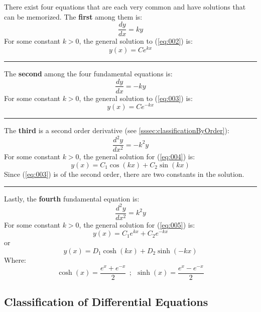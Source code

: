 \documentclass[12pt]{article}
\begin{document}
There exist four equations that are each very common and have solutions that can be memorized. The \textbf{first} among them is:
\begin{equation}
  \frac{dy}{dx} = ky
  \label{eq:002}
\end{equation}
For some constant $k>0$, the general solution to (\ref{eq:002}) is:
\begin{equation*}
  y(x) = Ce^{kx}
\end{equation*}
\hrule
The \textbf{second} among the four fundamental equations is:
\begin{equation}
  \frac{dy}{dx} = -ky
  \label{eq:003}
\end{equation}
For some constant $k>0$, the general solution to (\ref{eq:003}) is:
\begin{equation*}
  y(x) = Ce^{-kx}
\end{equation*}
\hrule
The \textbf{third} is a second order derivative (see \ref{sssec:classificationByOrder}):
\begin{equation}
  \frac{d^2y}{dx^2} = -k^2y
  \label{eq:004}
\end{equation}
For some constant $k>0$, the general solution for (\ref{eq:004}) is:
\begin{equation*}
  y(x) = C_1\cos(kx) + C_2\sin(kx)
\end{equation*}
Since (\ref{eq:003}) is of the second order, there are two constants in the solution.
\vspace{08pt}
\hrule
Lastly, the \textbf{fourth} fundamental equation is:
\begin{equation}
  \frac{d^2y}{dx^2} = k^2y
  \label{eq:005}
\end{equation}
For some constant $k>0$, the general solution for (\ref{eq:005}) is:
\begin{equation*}
  y(x) = C_1e^{kx} + C_2e^{-kx}
\end{equation*}
or
\begin{equation*}
  y(x) = D_1\cosh(kx) + D_2\sinh(-kx)
\end{equation*}
Where:
\begin{equation*}
  \cosh(x) = \frac{e^x+e^{-x}}{2}\ \ ;\ \ \sinh(x) = \frac{e^x-e^{-x}}{2}
\end{equation*}

\subsection{Classification of Differential Equations}
\label{ssec:classificationOfDifferentialEquations}
\end{document}
